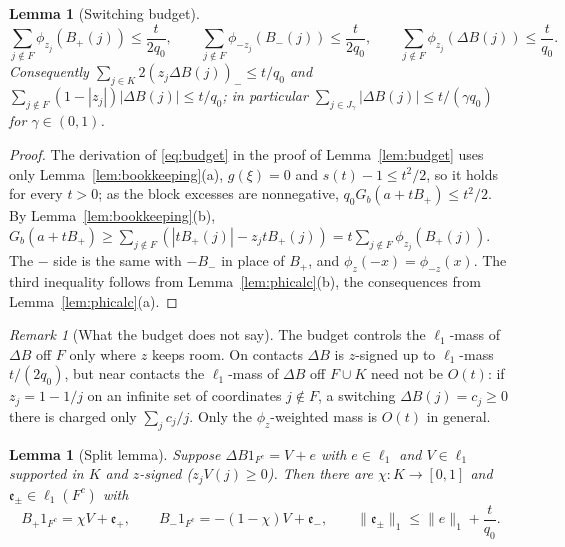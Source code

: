 \documentclass[10pt]{amsart}
\newtheorem{lemma}[theorem]{Lemma}
\theoremstyle{definition}
\theoremstyle{remark}
\newtheorem{remark}[theorem]{Remark}
\begin{document}
\begin{lemma}[Switching budget]\label{lem:switchbudget}
\[
 \sum_{j\notin F}\phi_{z_j}(B_+(j))\le\frac t{2q_0},\qquad
 \sum_{j\notin F}\phi_{-z_j}(B_-(j))\le\frac t{2q_0},\qquad
 \sum_{j\notin F}\phi_{z_j}(\Delta B(j))\le\frac t{q_0}.
\]
Consequently $\sum_{j\in K}2(z_j\Delta B(j))_-\le t/q_0$ and
$\sum_{j\notin F}(1-|z_j|)|\Delta B(j)|\le t/q_0$; in particular
$\sum_{j\in J_\gamma}|\Delta B(j)|\le t/(\gamma q_0)$ for $\gamma\in(0,1)$.
\end{lemma}

\begin{proof}
The derivation of \eqref{eq:budget} in the proof of
Lemma~\ref{lem:budget} uses only Lemma~\ref{lem:bookkeeping}(a),
$g(\xi)=0$ and $s(t)-1\le t^2/2$, so it holds for every $t>0$; as the
block excesses are nonnegative, $q_0G_b(a+tB_+)\le t^2/2$.  By
Lemma~\ref{lem:bookkeeping}(b), $G_b(a+tB_+)\ge\sum_{j\notin F}
(|tB_+(j)|-z_jtB_+(j))=t\sum_{j\notin F}\phi_{z_j}(B_+(j))$.  The $-$ side
is the same with $-B_-$ in place of $B_+$, and $\phi_z(-x)=\phi_{-z}(x)$.
The third inequality follows from Lemma~\ref{lem:phicalc}(b), the
consequences from Lemma~\ref{lem:phicalc}(a).
\end{proof}

\begin{remark}[What the budget does not say]\label{rem:budgetgloss}
The budget controls the $\ell_1$-mass of $\Delta B$ off $F$ only where
$z$ keeps room.  On contacts $\Delta B$ is $z$-signed up to $\ell_1$-mass
$t/(2q_0)$, but near contacts the $\ell_1$-mass of $\Delta B$ off $F\cup K$
need not be $O(t)$: if $z_j=1-1/j$ on an infinite set of coordinates
$j\notin F$, a switching $\Delta B(j)=c_j\ge0$ there is charged only
$\sum_jc_j/j$.  Only the $\phi_{z}$-weighted mass is $O(t)$ in general.
\end{remark}

\begin{lemma}[Split lemma]\label{lem:split}
Suppose $\Delta B1_{F^c}=V+e$ with $e\in\ell_1$ and $V\in\ell_1$ supported
in $K$ and $z$-signed \textup{(}$z_jV(j)\ge0$\textup{)}.  Then there are
$\chi:K\to[0,1]$ and $\mathfrak e_\pm\in\ell_1(F^c)$ with
\[
 B_+1_{F^c}=\chi V+\mathfrak e_+,\qquad B_-1_{F^c}=-(1-\chi)V+\mathfrak e_-,
 \qquad\|\mathfrak e_\pm\|_1\le\|e\|_1+\frac t{q_0}.
\]
\end{lemma}
\end{document}
